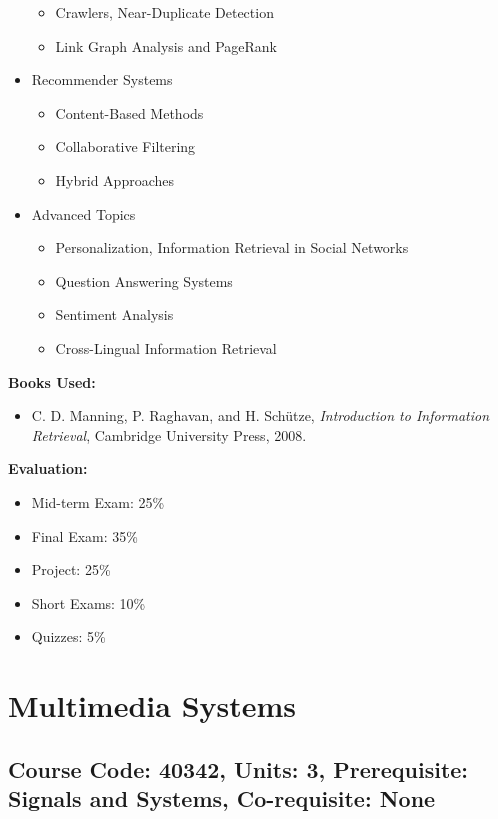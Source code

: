 \documentclass[12pt]{article}
\begin{document}
\begin{itemize}
    \begin{itemize}
        \item Crawlers, Near-Duplicate Detection
        \item Link Graph Analysis and PageRank
    \end{itemize}
    \item Recommender Systems
    \begin{itemize}
        \item Content-Based Methods
        \item Collaborative Filtering
        \item Hybrid Approaches
    \end{itemize}
    \item Advanced Topics
    \begin{itemize}
        \item Personalization, Information Retrieval in Social Networks
        \item Question Answering Systems
        \item Sentiment Analysis
        \item Cross-Lingual Information Retrieval
    \end{itemize}
\end{itemize}

\textbf{Books Used:}
\begin{itemize}
    \item C. D. Manning, P. Raghavan, and H. Schütze, \textit{Introduction to Information Retrieval}, Cambridge University Press, 2008.
\end{itemize}

\textbf{Evaluation:}
\begin{itemize}
    \item Mid-term Exam: 25\%
    \item Final Exam: 35\%
    \item Project: 25\%
    \item Short Exams: 10\%
    \item Quizzes: 5\%
\end{itemize}

\newpage

\section{Multimedia Systems}
\subsection*{Course Code: 40342, Units: 3, Prerequisite: Signals and Systems, Co-requisite: None}
\end{document}
